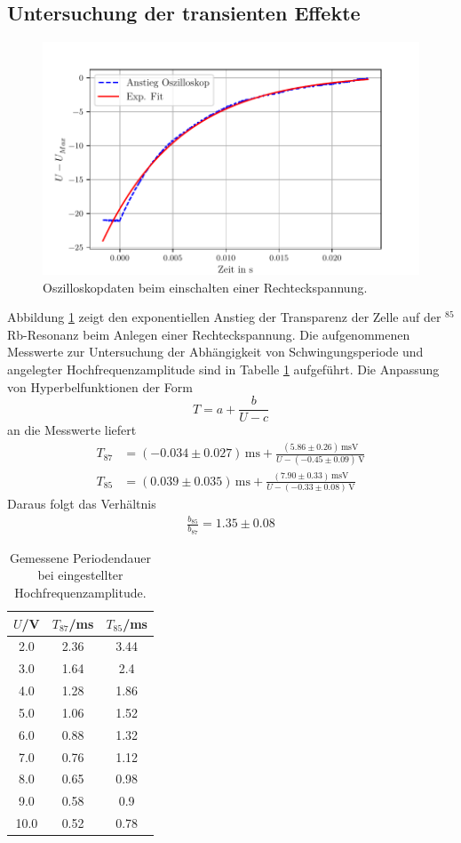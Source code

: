 \subsection{Untersuchung der transienten Effekte}
\begin{figure}
  \centering
  \includegraphics{anstieg.pdf}
  \caption{Oszilloskopdaten beim einschalten einer Rechteckspannung.}
  \label{fig:anstieg}
\end{figure}
\FloatBarrier
Abbildung \ref{fig:anstieg} zeigt den exponentiellen Anstieg der Transparenz
der Zelle auf der $^{85}$Rb-Resonanz beim Anlegen einer Rechteckspannung.
Die aufgenommenen Messwerte zur Untersuchung der Abhängigkeit von Schwingungsperiode 
und angelegter Hochfrequenzamplitude sind in Tabelle \ref{tab:periodendauer} aufgeführt. 
Die Anpassung von Hyperbelfunktionen der Form
\begin{equation}
  T=a+\frac{b}{U-c}
\end{equation}
%
an die Messwerte liefert
\begin{align*}
  T_{87}&=(-0.034\pm0.027)\,\text{ms}+\frac{(5.86\pm0.26)\,\text{msV}}{U-(-0.45\pm0.09)\,\text{V}} \\
  T_{85}&=(0.039\pm0.035)\,\text{ms}+\frac{(7.90\pm0.33)\,\text{msV}}{U-(-0.33\pm0.08)\,\text{V}}
\end{align*}
Daraus folgt das Verhältnis
\begin{align*}
  \frac{b_85}{b_87}=1.35\pm0.08
\end{align*}
\begin{table}
  \centering
  \caption{Gemessene Periodendauer bei eingestellter Hochfrequenzamplitude.}
  \label{tab:periodendauer}
  \begin{tabular}{c | c | c }
    \toprule
    $U$/V & $T_{87}$/ms & $T_{85}$/ms \\
    \midrule
    2.0 & 2.36 & 3.44 \\
    3.0 & 1.64 & 2.4 \\
    4.0 & 1.28 & 1.86 \\
    5.0 & 1.06 & 1.52 \\
    6.0 & 0.88 & 1.32 \\
    7.0 & 0.76 & 1.12 \\
    8.0 & 0.65 & 0.98 \\
    9.0 & 0.58 & 0.9 \\
    10.0 & 0.52 & 0.78 \\
    \bottomrule
  \end{tabular}
\end{table}
